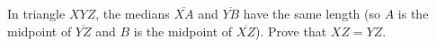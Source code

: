 In triangle $XYZ$, the medians $\overline{XA}$ and $\overline{YB}$ have the same length (so $A$ is the midpoint of $\overline{YZ}$ and $B$ is the midpoint of $\overline{XZ}$). Prove that $XZ=YZ$.
